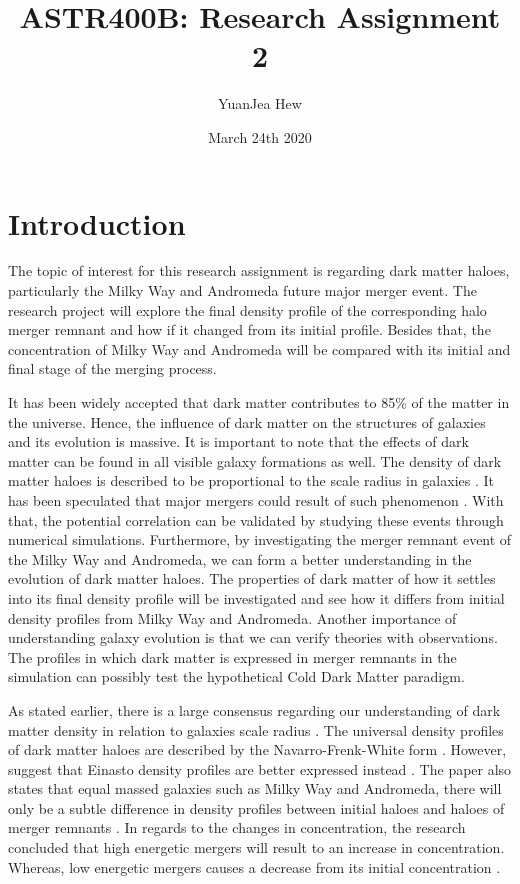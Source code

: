 \documentclass{article}
\title{ASTR400B: Research Assignment 2}
\author{YuanJea Hew}
\date{March 24th 2020}
\begin{document}
\maketitle

\section{Introduction}
The topic of interest for this research assignment is regarding dark matter haloes, particularly the Milky Way and Andromeda future major merger event. The research project will explore the final density profile of the corresponding halo merger remnant and how if it changed from its initial profile. Besides that, the concentration of Milky Way and Andromeda will be compared with its initial and final stage of the merging process. \par
It has been widely accepted that dark matter contributes to 85\% of the matter in the universe. Hence, the influence of dark matter on the structures of galaxies and its evolution is massive. It is important to note that the effects of dark matter can be found in all visible galaxy formations as well. The density of dark matter haloes is described to be proportional to the scale radius in galaxies . It has been speculated that major mergers could result of such phenomenon \citep{d19b}. With that, the potential correlation can be validated by studying these events through numerical simulations. Furthermore, by investigating the merger remnant event of the Milky Way and Andromeda, we can form a better understanding in the evolution of dark matter haloes. The properties of dark matter of how it settles into its final density profile will be investigated and see how it differs from initial density profiles from Milky Way and Andromeda. Another importance of understanding galaxy evolution is that we can verify theories with observations. The profiles in which dark matter is expressed in merger remnants in the simulation can possibly test the hypothetical Cold Dark Matter paradigm. \par 
As stated earlier, there is a large consensus regarding our understanding of dark matter density in relation to galaxies scale radius \citep{d19b}. The universal density profiles of dark matter haloes are described by the Navarro-Frenk-White form \citep{d19b}. However, \cite{d19b} suggest that Einasto density profiles are better expressed instead \citep{d19b}. The paper also states that equal massed galaxies such as Milky Way and Andromeda, there will only be a subtle difference in density profiles between initial haloes and haloes of merger remnants \citep{d19b}. In regards to the changes in concentration, the research concluded that high energetic mergers will result to an increase in concentration. Whereas, low energetic mergers causes a decrease from its initial concentration \citep{d19b}. \par
\end{document}

